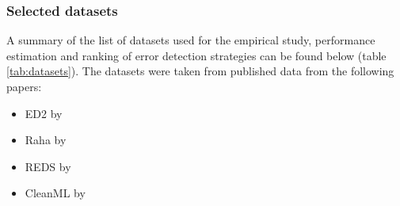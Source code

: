 
\subsubsection{Selected datasets}
A summary of the list of datasets used for the empirical study, performance estimation and ranking of error detection strategies can be found below (table \ref{tab:datasets}). The datasets were taken from published data from the following papers: 
\begin{itemize}
    \item ED2 by \cite{Neutatz2019-aw}
    \item Raha by \cite{Mahdavi2019-zf}
    \item REDS by \cite{Mahdavi2019-pk}
    \item CleanML by \cite{Li2019-ve}
\end{itemize}


